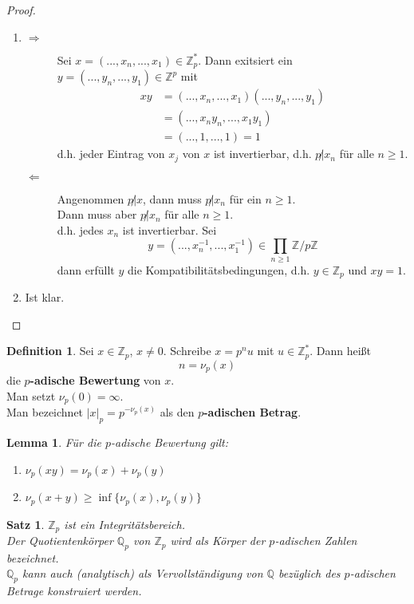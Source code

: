 \documentclass[10pt,a4paper]{article}
\newcommand{\Z}{\ensuremath{\mathbb{Z}}}
\newcommand{\Q}{\ensuremath{\mathbb{Q}}}
\theoremstyle{plain}
\newtheorem{lem}[theorem]{Lemma}
\newtheorem{satz}[theorem]{Satz}
\theoremstyle{definition}
\newtheorem{definition}[theorem]{Definition}
\theoremstyle{remark}
\begin{document}
	\begin{proof}
		\begin{enumerate}
			\item \begin{description}
				\item[$\Rightarrow$] Sei $x=(...,x_n,...,x_1)\in\Z_p^*$. Dann exitsiert ein $y=(...,y_n,...,y_1)\in\Z^p$ mit
				\begin{align*}
				xy&=(...,x_n,...,x_1)(...,y_n,...,y_1)\\
				&=(...,x_ny_n,...,x_1y_1)\\
				&=(...,1,...,1)=1
				\end{align*}
				d.h. jeder Eintrag von $x_j$ von $x$ ist invertierbar, d.h. $p\not| x_n$ für alle $n\geq 1$.
				\item[$\Leftarrow$] Angenommen $p\not| x$, dann muss $p\not| x_n$ für ein $n\geq 1$.\\
				Dann muss aber $p\not|x_n$ für alle $n\geq 1$.\\
				d.h. jedes $x_n$ ist invertierbar. Sei
				\[y=(...,x_n^{-1},...,x_1^{-1})\in\prod_{n\geq 1}\Z/p\Z\]
				dann erfüllt $y$ die Kompatibilitätsbedingungen, d.h. $y\in\Z_p$ und $xy=1$.
			\end{description}
			\item Ist klar.
		\end{enumerate}
	\end{proof}

	\begin{definition}
		Sei $x\in\Z_p$, $x\neq 0$. Schreibe $x=p^nu$ mit $u\in \Z_p^*$. Dann heißt\\
		\[n=\nu_p(x)\]
		die \textbf{$p$-adische Bewertung} von $x$.\\
		Man setzt $\nu_p(0)=\infty$.\\
		Man bezeichnet $|x|_p=p^{-\nu_p(x)}$ als den \textbf{$p$-adischen Betrag}.
	\end{definition}

	\begin{lem}
		Für die $p$-adische Bewertung gilt:
		\begin{enumerate}
			\item $\nu_p(xy)=\nu_p(x)+\nu_p(y)$
			\item $\nu_p(x+y)\geq\inf\big\{\nu_p(x),\nu_p(y)\big\}$
		\end{enumerate}
	\end{lem}

	\begin{satz}
		$\Z_p$ ist ein Integritätsbereich.\\
		Der Quotientenkörper $\Q_p$ von $\Z_p$ wird als Körper der $p$-adischen Zahlen bezeichnet.\\
		$\Q_p$ kann auch (analytisch) als Vervollständigung von $\Q$ bezüglich des $p$-adischen Betrage konstruiert werden.
	\end{satz}
\end{document}
